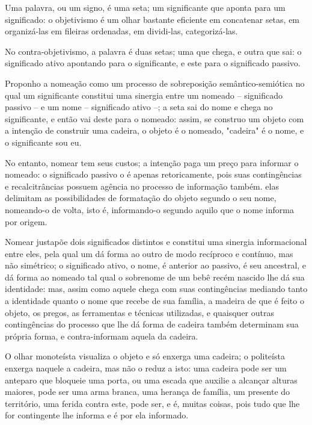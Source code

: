 Uma palavra, ou um signo, é uma seta;
    um significante que aponta para um significado:
        o objetivismo é um olhar bastante eficiente em concatenar setas, em organizá-las em fileiras ordenadas, em dividi-las, categorizá-las.

No contra-objetivismo, a palavra é duas setas;
    uma que chega, e outra que sai:
        o significado ativo apontando para o significante, e este para o significado passivo.

Proponho a nomeação como um processo de sobreposição semântico-semiótica no qual um significante constitui uma sinergia entre um nomeado -- significado passivo -- e um nome -- significado ativo --;
    a seta sai do nome e chega no significante, e então vai deste para o nomeado:
        assim, se construo um objeto com a intenção de construir uma cadeira, o objeto é o nomeado, "cadeira" é o nome, e o significante sou eu.

No entanto, nomear tem seus custos;
    a intenção paga um preço para informar o nomeado:
        o significado passivo o é apenas retoricamente, pois suas contingências e recalcitrâncias possuem agência no processo de informação também. elas delimitam as possibilidades de formatação do objeto segundo o seu nome, nomeando-o de volta, isto é, informando-o segundo aquilo que o nome informa por origem.

Nomear justapõe dois significados distintos e constitui uma sinergia informacional entre eles, pela qual um dá forma ao outro de modo recíproco e contínuo, mas não simétrico;
    o significado ativo, o nome, é anterior ao passivo, é seu ancestral, e dá forma ao nomeado tal qual o sobrenome de um bebê recém nascido lhe dá sua identidade:
        mas, assim como aquele chega com suas contingências mediando tanto a identidade quanto o nome que recebe de sua família, a madeira de que é feito o objeto, os pregos, as ferramentas e técnicas utilizadas, e quaisquer outras contingências do processo que lhe dá forma de cadeira também determinam sua própria forma, e contra-informam aquela da cadeira.

O olhar monoteísta visualiza o objeto e só enxerga uma cadeira;
    o politeísta enxerga naquele a cadeira, mas não o reduz a isto:
        uma cadeira pode ser um anteparo que bloqueie uma porta, ou uma escada que auxilie a alcançar alturas maiores, pode ser uma arma branca, uma herança de família, um presente do território, uma ferida contra este, pode ser, e é, muitas coisas, pois tudo que lhe for contingente lhe informa e é por ela informado.

